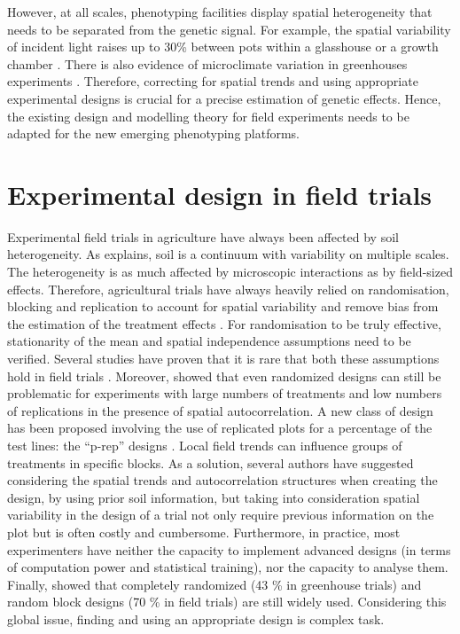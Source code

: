 However, at all scales, phenotyping facilities display spatial heterogeneity that needs to be separated from the genetic signal. For example, the spatial variability of incident light raises up to 30\% between pots within a glasshouse or a growth chamber \parencite{cabrera-bosquet_high-throughput_2016}. There is also evidence of microclimate variation in greenhouses experiments \parencite{brien_accounting_2013}. Therefore, correcting for spatial trends and using appropriate experimental designs is crucial for a precise estimation of genetic effects. Hence, the existing design and modelling theory for field experiments needs to be adapted for the new emerging phenotyping platforms.\\

\section{Experimental design in field trials}
Experimental field trials in agriculture have always been affected by soil heterogeneity. As \textcite{van_es_1.2_2002} explains, soil is a continuum with variability on multiple scales. 
The heterogeneity is as much affected by microscopic interactions as by field-sized effects. 
Therefore, agricultural trials have always heavily relied on randomisation, blocking and replication to account for spatial variability and remove bias from the estimation of the treatment effects \parencite{atkinson_one_2001}. 
For randomisation to be truly effective, stationarity of the mean and spatial independence assumptions need to be verified. Several studies have proven that it is rare that both these assumptions hold in field trials \parencite{davidoff_method_1986,nielsen_spatial_1973,iqbal_spatial_2005}. 
Moreover, \textcite{van_es_spatial_1993} showed that even randomized designs can still be problematic for experiments with large numbers of treatments and low numbers of replications in the presence of spatial autocorrelation. A new class of design has been proposed involving the use of replicated plots for a percentage of the test lines: the “p-rep” designs \parencite{cullis_design_2006,velazco_modelling_2017}.
Local field trends can influence groups of treatments in specific blocks. As a solution, several authors \parencite{watson_spatial_2000,fagroud_accounting_2002} have suggested considering the spatial trends and autocorrelation structures when creating the design, by using prior soil information, but taking into consideration spatial variability in the design of a trial not only require previous information on the plot but is often costly and cumbersome. 
Furthermore, in practice, most experimenters have neither the capacity to implement advanced designs (in terms of computation power and statistical training), nor the capacity to analyse them. 
Finally, \textcite{van_es_spatially-balanced_2007} showed that completely randomized (43 \% in greenhouse trials) and random block designs (70 \% in field trials) are still widely used.
Considering this global issue, finding and using an appropriate design is complex task.

